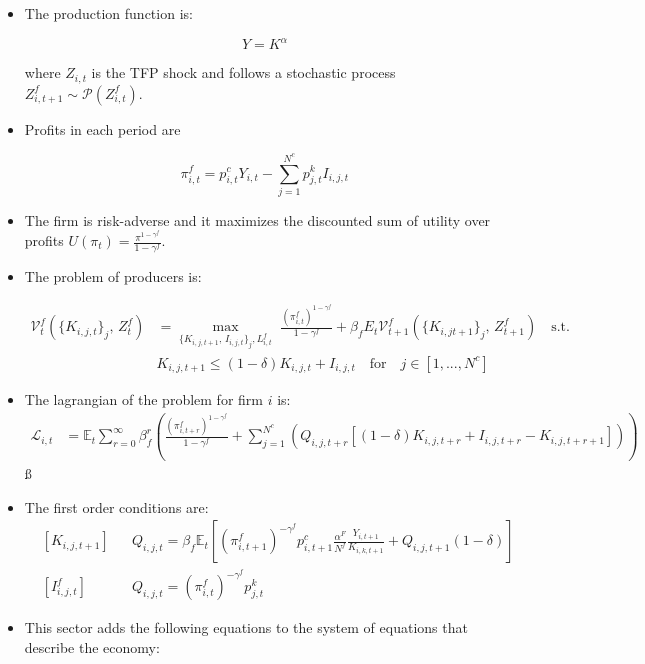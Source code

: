 \documentclass[11pt]{article}
\newcommand{\E}{\mathbb{E}}
\numberwithin{equation}{section}
\begin{document}
\begin{itemize}
\begin{itemize}
		\item The production function is:
		
		$$Y=K^{\alpha}$$
		
		where $Z_{i,t}$ is the TFP shock and follows a stochastic process $Z^f_{i,t+1} \sim \mathcal{P}(Z^f_{i,t})$. 
		
		\item Profits in each period are
		
		$$\pi^f_{i,t}=p^c_{i,t} Y_{i,t}-\sum_{j=1}^{N^c} p^k_{j,t} I_{i,j,t}$$
		
		\item The firm is risk-adverse and it maximizes the discounted sum of utility over profits $U(\pi_t) = \frac{\pi^{1-\gamma^f}}{1-\gamma^f}$.
		
		\item The problem of producers is:
		
		\begin{align*}
		\mathcal{V}_{t}^{f}\left(\{K_{i,j,t}\}_j,\,Z_t^f\right)&=\max_{\{K_{i,j,t+1},\, I_{i,j,t}\}_j,  L^f_{i,t}}\,\,
		\frac{\left(\pi_{i,t}^f\right)^{1-\gamma^f}}{1-\gamma^f}+\beta_f E_{t}\mathcal{V}^f_{t+1}(\{K_{i,jt+1}\}_j,\,Z_{t+1}^f)\quad\text{{s.t.}}\\
		&K_{i,j,t+1} \leq(1-\delta)K_{i,j,t}+I_{i,j,t} \quad \text{for} \quad j \in [1,...,N^c]
		\end{align*}
		
		\item The lagrangian of the problem for firm $i$ is:
		\begin{align*}
		\mathcal{L}_{i,t} &= \E_t \sum_{r=0}^{\infty}\beta^r_f \left(\frac{\left(\pi_{i,t+r}^f\right)^{1-\gamma^f}}{1-\gamma^f} +
		\sum_{j=1}^{N^c} \left(Q_{i,j,t+r} [(1-\delta)K_{i,j,t+r}+I_{i,j,t+r} -K_{i,j,t+r+1}]\right) \right)
		\end{align*}ß
		
		\item The first order conditions are:
		\begin{align}
		& \left[K_{i,j,t+1}\right]
		&&
		Q_{i,j,t} =\beta_f \E_t \left[\left(\pi_{i,t+1}^f\right)^{-\gamma^f} p^c_{i,t+1} \frac{\alpha^F}{N^f} \frac{Y_{i,t+1}}{K_{i,k,t+1}} +Q_{i,j,t+1} (1-\delta) \right]
		\\
		& \left[ I^f_{i,j,t} \right]
		&&
		Q_{i,j,t} = \left(\pi_{i,t}^f\right)^{-\gamma^f} p^k_{j,t}
		\end{align}
		
		
		
		\item This sector adds the following equations to the system of equations that describe the economy:
		

\end{itemize}
\end{itemize}
\end{document}
